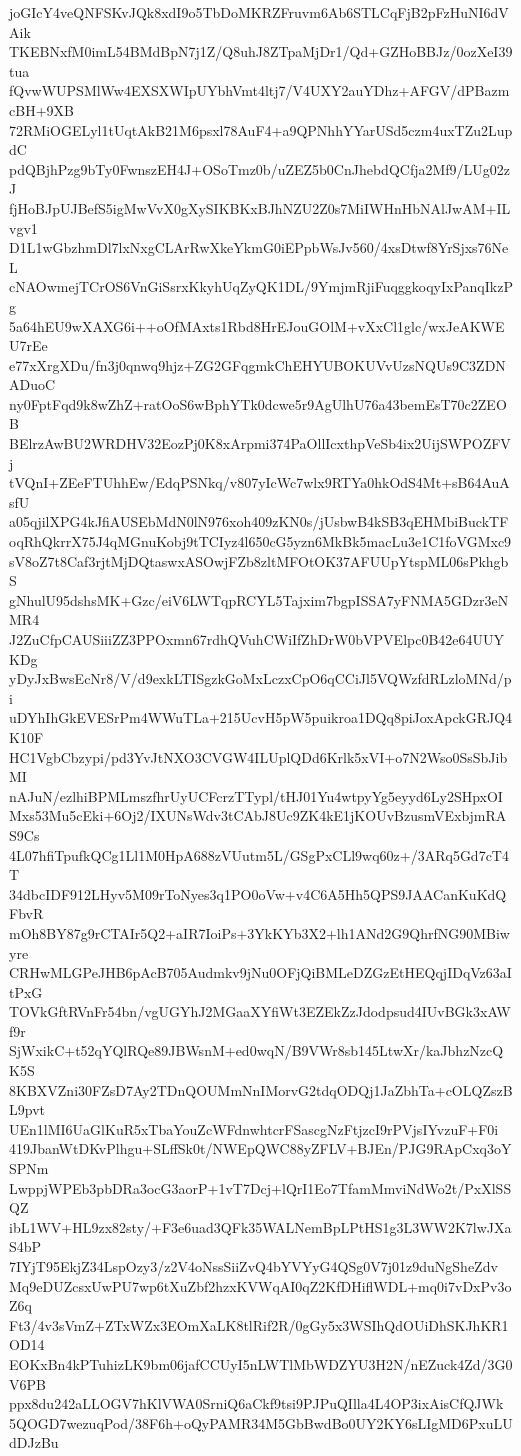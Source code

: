 joGIcY4veQNFSKvJQk8xdI9o5TbDoMKRZFruvm6Ab6STLCqFjB2pFzHuNI6dVAik
TKEBNxfM0imL54BMdBpN7j1Z/Q8uhJ8ZTpaMjDr1/Qd+GZHoBBJz/0ozXeI39tua
fQvwWUPSMlWw4EXSXWIpUYbhVmt4ltj7/V4UXY2auYDhz+AFGV/dPBazmcBH+9XB
72RMiOGELyl1tUqtAkB21M6psxl78AuF4+a9QPNhhYYarUSd5czm4uxTZu2LupdC
pdQBjhPzg9bTy0FwnszEH4J+OSoTmz0b/uZEZ5b0CnJhebdQCfja2Mf9/LUg02zJ
fjHoBJpUJBefS5igMwVvX0gXySIKBKxBJhNZU2Z0s7MiIWHnHbNAlJwAM+ILvgv1
D1L1wGbzhmDl7lxNxgCLArRwXkeYkmG0iEPpbWsJv560/4xsDtwf8YrSjxs76NeL
cNAOwmejTCrOS6VnGiSsrxKkyhUqZyQK1DL/9YmjmRjiFuqggkoqyIxPanqIkzPg
5a64hEU9wXAXG6i++oOfMAxts1Rbd8HrEJouGOlM+vXxCl1glc/wxJeAKWEU7rEe
e77xXrgXDu/fn3j0qnwq9hjz+ZG2GFqgmkChEHYUBOKUVvUzsNQUs9C3ZDNADuoC
ny0FptFqd9k8wZhZ+ratOoS6wBphYTk0dcwe5r9AgUlhU76a43bemEsT70c2ZEOB
BElrzAwBU2WRDHV32EozPj0K8xArpmi374PaOllIcxthpVeSb4ix2UijSWPOZFVj
tVQnI+ZEeFTUhhEw/EdqPSNkq/v807yIcWc7wlx9RTYa0hkOdS4Mt+sB64AuAsfU
a05qjilXPG4kJfiAUSEbMdN0lN976xoh409zKN0s/jUsbwB4kSB3qEHMbiBuckTF
oqRhQkrrX75J4qMGnuKobj9tTCIyz4l650cG5yzn6MkBk5macLu3e1C1foVGMxc9
sV8oZ7t8Caf3rjtMjDQtaswxASOwjFZb8zltMFOtOK37AFUUpYtspML06sPkhgbS
gNhulU95dshsMK+Gzc/eiV6LWTqpRCYL5Tajxim7bgpISSA7yFNMA5GDzr3eNMR4
J2ZuCfpCAUSiiiZZ3PPOxmn67rdhQVuhCWiIfZhDrW0bVPVElpc0B42e64UUYKDg
yDyJxBwsEcNr8/V/d9exkLTISgzkGoMxLczxCpO6qCCiJl5VQWzfdRLzloMNd/pi
uDYhIhGkEVESrPm4WWuTLa+215UcvH5pW5puikroa1DQq8piJoxApckGRJQ4K10F
HC1VgbCbzypi/pd3YvJtNXO3CVGW4ILUplQDd6Krlk5xVI+o7N2Wso0SsSbJibMI
nAJuN/ezlhiBPMLmszfhrUyUCFcrzTTypl/tHJ01Yu4wtpyYg5eyyd6Ly2SHpxOI
Mxs53Mu5cEki+6Oj2/IXUNsWdv3tCAbJ8Uc9ZK4kE1jKOUvBzusmVExbjmRAS9Cs
4L07hfiTpufkQCg1Ll1M0HpA688zVUutm5L/GSgPxCLl9wq60z+/3ARq5Gd7cT4T
34dbcIDF912LHyv5M09rToNyes3q1PO0oVw+v4C6A5Hh5QPS9JAACanKuKdQFbvR
mOh8BY87g9rCTAIr5Q2+aIR7IoiPs+3YkKYb3X2+lh1ANd2G9QhrfNG90MBiwyre
CRHwMLGPeJHB6pAcB705Audmkv9jNu0OFjQiBMLeDZGzEtHEQqjIDqVz63aItPxG
TOVkGftRVnFr54bn/vgUGYhJ2MGaaXYfiWt3EZEkZzJdodpsud4IUvBGk3xAWf9r
SjWxikC+t52qYQlRQe89JBWsnM+ed0wqN/B9VWr8sb145LtwXr/kaJbhzNzcQK5S
8KBXVZni30FZsD7Ay2TDnQOUMmNnIMorvG2tdqODQj1JaZbhTa+cOLQZszBL9pvt
UEn1lMI6UaGlKuR5xTbaYouZcWFdnwhtcrFSascgNzFtjzcI9rPVjsIYvzuF+F0i
419JbanWtDKvPlhgu+SLffSk0t/NWEpQWC88yZFLV+BJEn/PJG9RApCxq3oYSPNm
LwppjWPEb3pbDRa3ocG3aorP+1vT7Dcj+lQrI1Eo7TfamMmviNdWo2t/PxXlSSQZ
ibL1WV+HL9zx82sty/+F3e6uad3QFk35WALNemBpLPtHS1g3L3WW2K7lwJXaS4bP
7IYjT95EkjZ34LspOzy3/z2V4oNssSiiZvQ4bYVYyG4QSg0V7j01z9duNgSheZdv
Mq9eDUZcsxUwPU7wp6tXuZbf2hzxKVWqAI0qZ2KfDHiflWDL+mq0i7vDxPv3oZ6q
Ft3/4v3sVmZ+ZTxWZx3EOmXaLK8tlRif2R/0gGy5x3WSIhQdOUiDhSKJhKR1OD14
EOKxBn4kPTuhizLK9bm06jafCCUyI5nLWTlMbWDZYU3H2N/nEZuck4Zd/3G0V6PB
ppx8du242aLLOGV7hKlVWA0SrniQ6aCkf9tsi9PJPuQIlla4L4OP3ixAisCfQJWk
5QOGD7wezuqPod/38F6h+oQyPAMR34M5GbBwdBo0UY2KY6sLIgMD6PxuLUdDJzBu
